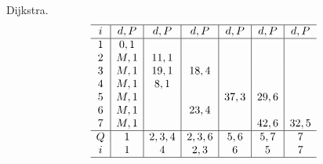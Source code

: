 Dijkstra.
\begin{equation*}
\begin{array}{ c|c|c|c|c|c|c }
\hline
i & d,P & d,P & d,P & d,P & d,P & d,P\\
\hline
1 & 0,1 &  &  &  &  & \\
2 & M,1 & 11,1 &  &  &  & \\
3 & M,1 & 19,1 & 18,4 &  &  & \\
4 & M,1 & 8,1 &  &  &  & \\
5 & M,1 &  &  & 37,3 & 29,6 & \\
6 & M,1 &  & 23,4 &  &  & \\
7 & M,1 &  &  &  & 42,6 & 32,5\\
\hline
Q & 1 & 2,3,4 & 2,3,6 & 5,6 & 5,7 & 7\\
i & 1 & 4 & 2,3 & 6 & 5 & 7\\
\hline
\end{array}
\end{equation*}

\newpage

\Es

